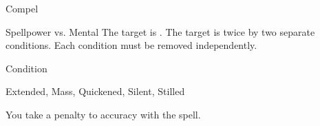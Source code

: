 \begin{spellsection}{Compel}
\begin{spellheader}
\end{spellheader}
\begin{spellcontent}
\begin{spelltargetinginfo}
\end{spelltargetinginfo}
\begin{spelleffects}
\begin{spellattack}{Spellpower vs. Mental}
\spellsuccess The target is \immobilized.
\spellcritical
The target is \immobilized twice by two separate conditions.
Each condition must be removed independently.
\end{spellattack}
\spelldur Condition
\end{spelleffects}
\end{spellcontent}
\begin{spellfooter}
 Extended, Mass, Quickened, Silent, Stilled
\end{spellfooter}
\begin{spellsubcontent}
\begin{spellcantrip}
You take a  penalty to accuracy with the spell.
\end{spellcantrip}
\end{spellsubcontent}
\end{spellsection}
